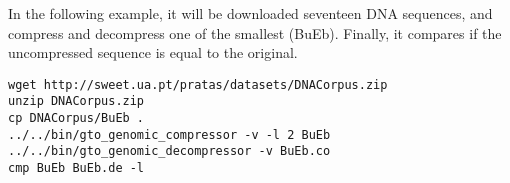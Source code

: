 In the following example, it will be downloaded seventeen DNA sequences, and compress and decompress one of the smallest (BuEb). Finally, it compares if the uncompressed sequence is equal to the original.
\begin{lstlisting}
wget http://sweet.ua.pt/pratas/datasets/DNACorpus.zip
unzip DNACorpus.zip
cp DNACorpus/BuEb .
../../bin/gto_genomic_compressor -v -l 2 BuEb
../../bin/gto_genomic_decompressor -v BuEb.co 
cmp BuEb BuEb.de -l
\end{lstlisting}